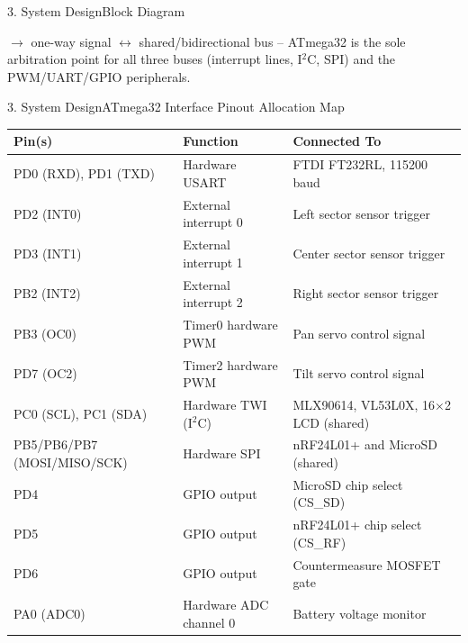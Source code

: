 \documentclass[aspectratio=169, 10pt]{beamer}
\begin{document}
\begin{frame}{3. System Design}{Block Diagram}
{
    }
    \vspace{0.15cm}
    {\scriptsize\color{Dim} $\rightarrow$ one-way signal \quad $\leftrightarrow$ shared/bidirectional bus \quad -- ATmega32 is the sole arbitration point for all three buses (interrupt lines, I$^2$C, SPI) and the PWM/UART/GPIO peripherals.}
\end{frame}

\begin{frame}{3. System Design}{ATmega32 Interface Pinout Allocation Map}
    \scriptsize
    \begin{table}
        \centering
        \begin{tabular}{lll}
            \toprule
            \textbf{\color{Accent} Pin(s)} & \textbf{\color{Accent} Function} & \textbf{\color{Accent} Connected To} \\
            \midrule
            PD0 (RXD), PD1 (TXD) & Hardware USART & FTDI FT232RL, 115200 baud \\
            PD2 (INT0) & External interrupt 0 & Left sector sensor trigger \\
            PD3 (INT1) & External interrupt 1 & Center sector sensor trigger \\
            PB2 (INT2) & External interrupt 2 & Right sector sensor trigger \\
            PB3 (OC0) & Timer0 hardware PWM & Pan servo control signal \\
            PD7 (OC2) & Timer2 hardware PWM & Tilt servo control signal \\
            PC0 (SCL), PC1 (SDA) & Hardware TWI (I$^2$C) & MLX90614, VL53L0X, 16$\times$2 LCD (shared) \\
            PB5/PB6/PB7 (MOSI/MISO/SCK) & Hardware SPI & nRF24L01+ and MicroSD (shared) \\
            PD4 & GPIO output & MicroSD chip select (CS\_SD) \\
            PD5 & GPIO output & nRF24L01+ chip select (CS\_RF) \\
            PD6 & GPIO output & Countermeasure MOSFET gate \\
            PA0 (ADC0) & Hardware ADC channel 0 & Battery voltage monitor \\
            \bottomrule
        \end{tabular}
    \end{table}
\end{frame}
\end{document}
